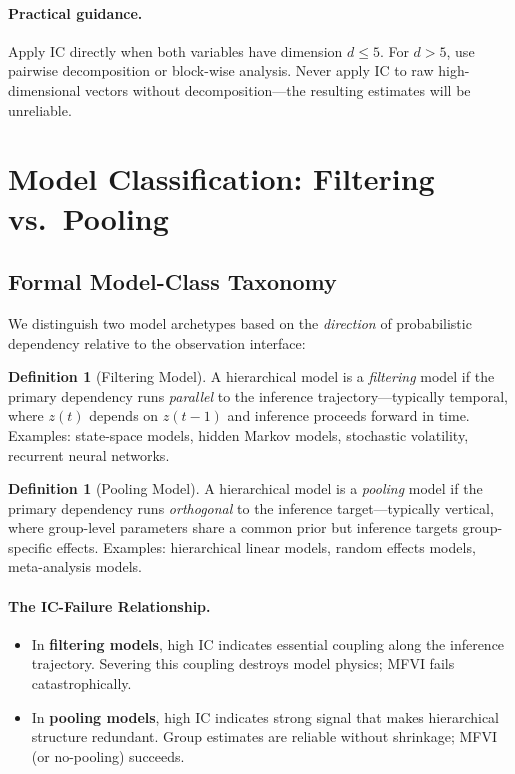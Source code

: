 \documentclass[10pt]{article} %
\theoremstyle{plain}
\theoremstyle{definition}
\newtheorem{definition}[theorem]{Definition}
\begin{document}
\paragraph{Practical guidance.} Apply IC directly when both variables have dimension $d \leq 5$. For $d > 5$, use pairwise decomposition or block-wise analysis. Never apply IC to raw high-dimensional vectors without decomposition---the resulting estimates will be unreliable.

\section{Model Classification: Filtering vs.\ Pooling}
\label{sec:unified}

\subsection{Formal Model-Class Taxonomy}
\label{sec:taxonomy}

We distinguish two model archetypes based on the \emph{direction} of probabilistic dependency relative to the observation interface:

\begin{definition}[Filtering Model]
A hierarchical model is a \emph{filtering} model if the primary dependency runs \emph{parallel} to the inference trajectory---typically temporal, where $z(t)$ depends on $z(t-1)$ and inference proceeds forward in time. Examples: state-space models, hidden Markov models, stochastic volatility, recurrent neural networks.
\end{definition}

\begin{definition}[Pooling Model]
A hierarchical model is a \emph{pooling} model if the primary dependency runs \emph{orthogonal} to the inference target---typically vertical, where group-level parameters share a common prior but inference targets group-specific effects. Examples: hierarchical linear models, random effects models, meta-analysis models.
\end{definition}

\paragraph{The IC-Failure Relationship.}
\begin{itemize}
    \item In \textbf{filtering models}, high IC indicates essential coupling along the inference trajectory. Severing this coupling destroys model physics; MFVI fails catastrophically.
    \item In \textbf{pooling models}, high IC indicates strong signal that makes hierarchical structure redundant. Group estimates are reliable without shrinkage; MFVI (or no-pooling) succeeds.
\end{itemize}
\end{document}
